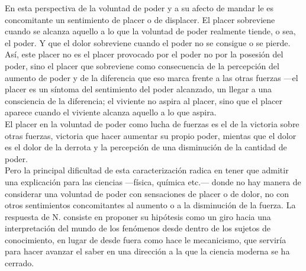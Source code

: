 \documentclass[a4paper, 10pt, twocolumn, spanish]{article}
\begin{document}
En esta perspectiva de la voluntad de poder y a su afecto de mandar le
es concomitante un sentimiento de placer o de displacer. El placer
sobreviene cuando se alcanza aquello a lo que la voluntad de poder
realmente tiende, o sea, el poder. Y que el dolor sobreviene cuando el
poder no se consigue o se pierde.\\[0pt]
Así, este placer no es el placer provocado por el poder no por la
posesión del poder, sino el placer que sobreviene como consecuencia de
la percepción del aumento de poder y de la diferencia que eso marca
frente a las otras fuerzas —el placer es un síntoma del sentimiento
del poder alcanzado, un llegar a una consciencia de la diferencia; el
viviente no aspira al placer, sino que el placer aparece cuando el
viviente alcanza aquello a lo que aspira.\\[0pt]
El placer en la voluntad de poder como lucha de fuerzas es el de la
victoria sobre otras fuerzas, victoria que hacer aumentar su propio
poder, mientas que el dolor es el dolor de la derrota y la percepción
de una disminución de la cantidad de poder.\\[0pt]
Pero la principal dificultad de esta caracterización radica en tener
que admitir una explicación para las ciencias —física, química etc.—
donde no hay manera de considerar una voluntad de poder con
sensaciones de placer o de dolor, no con otros sentimientos
concomitantes al aumento o a la disminución de la fuerza. La respuesta
de N. consiste en proponer su hipótesis como un giro hacia una
interpretación del mundo de los fenómenos desde dentro de los sujetos
de conocimiento, en lugar de desde fuera como hace le mecanicismo, que
serviría para hacer avanzar el saber en una dirección a la que la
ciencia moderna se ha cerrado.\\[0pt]
\end{document}
